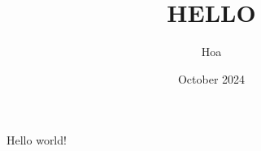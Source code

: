 \documentclass{article}
\title{HELLO}
\author{Hoa}
\date{October 2024}
\begin{document}
	\maketitle
	Hello world!
\end{document}
